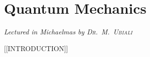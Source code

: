 \chapter[Quantum Mechanics \\ \textnormal{\emph{Lectured in Michaelmas \oldstylenums{2021} by \textsc{Dr.\ M.\ Ubiali}}}]{Quantum Mechanics}
\emph{\Large Lectured in Michaelmas  by \textsc{Dr.\ M.\ Ubiali}}

[[INTRODUCTION]]


